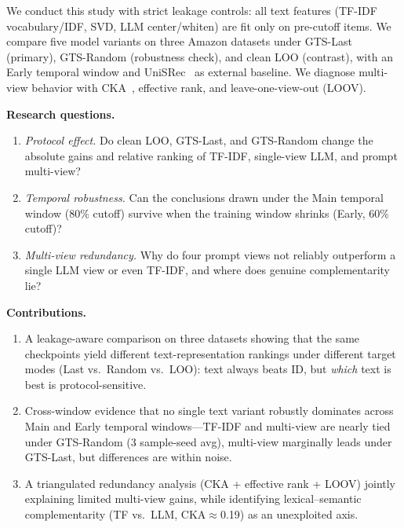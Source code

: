 \documentclass[sigconf,natbib=true,anonymous]{acmart}
\newcommand{\tfidf}{\textsc{TF-IDF}\xspace}
\newcommand{\llm}{\textsc{LLM}\xspace}
\begin{document}
We conduct this study with strict leakage controls: all text features (\tfidf vocabulary/IDF, SVD, LLM center/whiten) are fit only on pre-cutoff items.
We compare five model variants on three Amazon datasets under GTS-Last (primary), GTS-Random (robustness check), and clean LOO (contrast), with an Early temporal window and UniSRec~\cite{hou2022unisrec} as external baseline.
We diagnose multi-view behavior with CKA~\cite{kornblith2019cka}, effective rank, and leave-one-view-out (LOOV).

\smallskip\noindent\textbf{Research questions.}
\begin{enumerate}[leftmargin=*,itemsep=1pt]
\item[\textbf{RQ1}] \emph{Protocol effect.}
Do clean LOO, GTS-Last, and GTS-Random change the absolute gains and relative ranking of \tfidf, single-view \llm, and prompt multi-view?
\item[\textbf{RQ2}] \emph{Temporal robustness.}
Can the conclusions drawn under the Main temporal window ($80\%$ cutoff) survive when the training window shrinks (Early, $60\%$ cutoff)?
\item[\textbf{RQ3}] \emph{Multi-view redundancy.}
Why do four prompt views not reliably outperform a single \llm view or even \tfidf, and where does genuine complementarity lie?
\end{enumerate}

\smallskip\noindent\textbf{Contributions.}
\begin{enumerate}[leftmargin=*,itemsep=1pt]
\item A leakage-aware comparison on three datasets showing that the same checkpoints yield different text-representation rankings under different target modes (Last vs.\ Random vs.\ LOO): text always beats ID, but \emph{which} text is best is protocol-sensitive.
\item Cross-window evidence that no single text variant robustly dominates across Main and Early temporal windows---\tfidf and multi-view are nearly tied under GTS-Random (3 sample-seed avg), multi-view marginally leads under GTS-Last, but differences are within noise.
\item A triangulated redundancy analysis (CKA + effective rank + LOOV) jointly explaining limited multi-view gains, while identifying lexical--semantic complementarity (TF vs.\ LLM, CKA$\approx$0.19) as an unexploited axis.
\end{enumerate}

\end{document}
